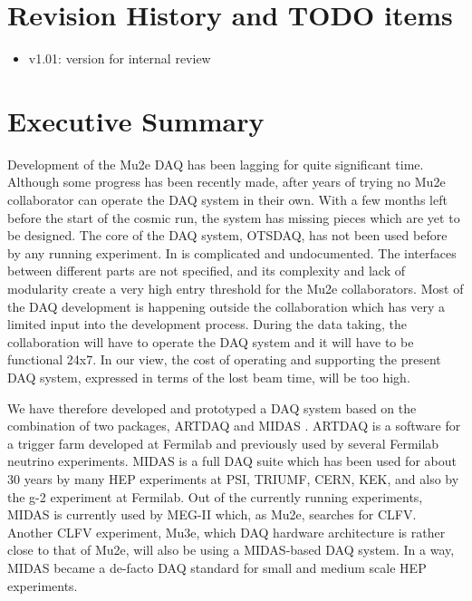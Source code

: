 \documentclass[12pt]{article}
\begin{document}
\section {Revision History and TODO items}

\begin{itemize}
\item
  v1.01: version for internal review
\end{itemize}

% 
\newpage
\section {Executive Summary}

Development of the Mu2e DAQ has been lagging for quite significant time.
Although some progress has been recently made, after years of trying no Mu2e collaborator
can operate the DAQ system in their own. With a few months left before the start of the
cosmic run, the system has missing pieces which are yet to be designed.
%
The core of the DAQ system, OTSDAQ, has not been used before by any running experiment.
In is complicated and undocumented. The interfaces between different parts are not
specified, and its complexity and lack of modularity create a very high entry
threshold for the Mu2e collaborators.
%
Most of the DAQ development is happening outside the collaboration which has very
a limited input into the development process.
%
During the data taking, the collaboration will have to operate the DAQ system
and it will have to be functional 24x7. In our view, the cost of operating 
and supporting the present DAQ system, expressed in terms of the lost beam time,
will be too high.

% 
We have therefore developed and prototyped a DAQ system based on the combination of two
packages, ARTDAQ \cite{2017_ARTDAQ_Biery} and MIDAS \cite{2025_MIDAS_WIKI}.
%
ARTDAQ is a software for a trigger farm developed at Fermilab and previously used
by several Fermilab neutrino experiments. 
%
MIDAS is a full DAQ suite which has been used for about 30 years by many HEP experiments
at PSI, TRIUMF, CERN, KEK, and also by the g-2 experiment at Fermilab.
%
Out of the currently running experiments, MIDAS is currently used by MEG-II which,
as Mu2e,  searches for CLFV. Another CLFV experiment, Mu3e, which DAQ hardware architecture
is rather close to that of Mu2e, will also be using a MIDAS-based DAQ system.
In a way, MIDAS became a de-facto DAQ standard for small and medium scale HEP
experiments.
\end{document}
